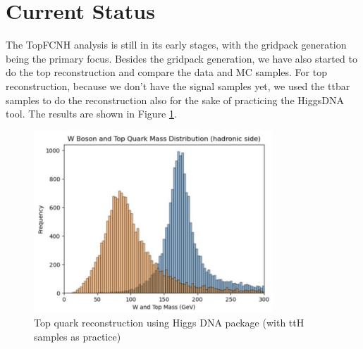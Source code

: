 \section{Current Status}

The TopFCNH analysis is still in its early stages, with the gridpack generation being the primary focus. Besides the gridpack generation, we have also started to do the top reconstruction and compare the data and MC samples. For top reconstruction, because we don't have the signal samples yet, we used the ttbar samples to do the reconstruction also for the sake of practicing the HiggsDNA tool.  The results are shown in Figure \ref{fig:TopFCNC_reconstruction}.

\begin{figure}[htbp]
    \centering
    \includegraphics[width=0.8\textwidth]{Figures/TopFCNC_reconstruction.png}
    \caption{Top quark reconstruction using Higgs DNA package (with ttH samples as practice)}
    \label{fig:TopFCNC_reconstruction}
\end{figure}